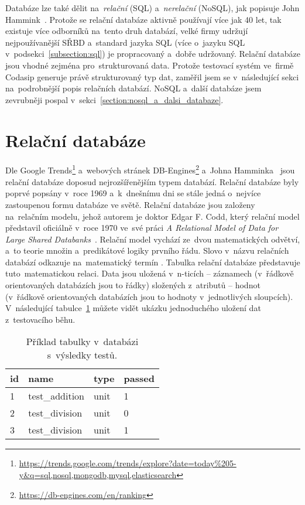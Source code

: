 Databáze lze také dělit na~\textit{relační} (SQL) a~\textit{nerelační} (NoSQL), jak popisuje John
Hammink~\cite{TypesOfDatabases}. Protože se relační databáze aktivně používají více jak 40 let, tak existuje více
odborníků na~tento druh databází, velké firmy udržují nejpoužívanější SŘBD a~standard jazyka SQL (více o~jazyku SQL v~podsekci~\ref{subsection:sql}) je propracovaný a~dobře udržovaný. Relační databáze jsou vhodné zejména pro~strukturovaná data. Protože testovací systém ve~firmě Codasip generuje právě strukturovaný typ dat, zaměřil jsem se v~následující sekci na~podrobnější popis relačních databází. NoSQL a~další databáze jsem zevrubněji pospal v~sekci~\ref{section:nosql_a_dalsi_databaze}.

\section{Relační databáze}
\label{section:relacni_databaze}
Dle Google Trends\footnote{\href{https://trends.google.com/trends/explore?date=today\%205-y\&q=sql,nosql,mongodb,mysql,elasticsearch}{https://trends.google.com/trends/explore?date=today\%205-y\&q=sql,nosql,mongodb,mysql,elasticsearch}} a~webových stránek DB-Engines\footnote{\href{https://db-engines.com/en/ranking}{https://db-engines.com/en/ranking}} a~Johna Hamminka~\cite{TypesOfDatabases} jsou relační databáze doposud nejrozšířenějším typem databází.
Relační databáze byly poprvé popsány v~roce 1969 a~k~dnešnímu dni se stále jedná o~nejvíce zastoupenou formu
databáze ve světě. Relační databáze jsou založeny na~relačním modelu, jehož autorem je doktor Edgar F. Codd, který
relační model představil oficiálně v~roce 1970 ve~své práci \textit{A Relational Model of Data for Large Shared
Databanks}~\cite{E.F.Codd}. Relační model vychází ze~dvou matematických odvětví, a~to teorie množin a~predikátové
logiky prvního řádu. Slovo  v~názvu relačních databází odkazuje na~matematický termín .
Tabulka relační databáze představuje tuto~matematickou relaci. Data jsou uložená v~n-ticích -- záznamech (v~řádkově
orientovaných databázích jsou to řádky) složených z~atributů -- hodnot (v~řádkově orientovaných databázích jsou to
hodnoty v~jednotlivých sloupcích). V~následující tabulce~\ref{tab:rel_db_table_example} můžete vidět ukázku jednoduchého uložení dat z~testovacího běhu.
\begin{table}[h]
\centering
\begin{tabular}{|l|l|l|l|}
\hline
id & name           & type & passed \\ \hline
1  & test\_addition & unit & 1      \\ \hline
2  & test\_division & unit & 0      \\ \hline
3  & test\_division & unit & 1      \\ \hline
\end{tabular}
\caption{Příklad tabulky v~databázi s~výsledky testů.}
\label{tab:rel_db_table_example}
\end{table}

